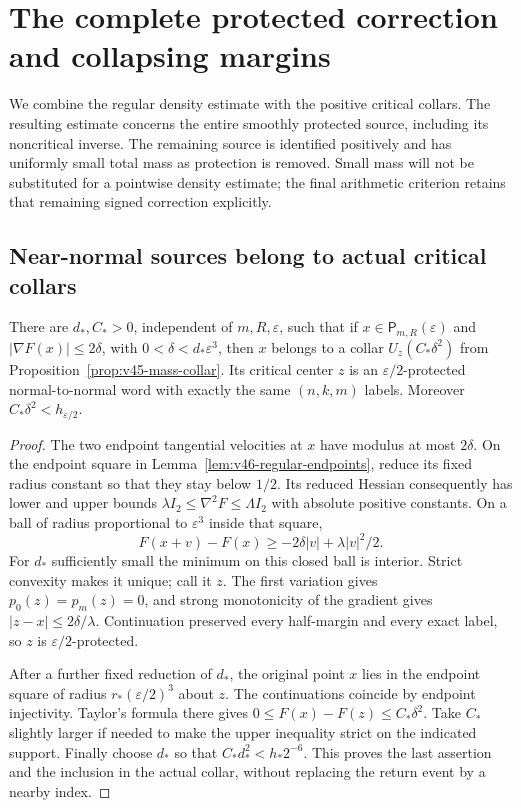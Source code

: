 \section{The complete protected correction and collapsing margins}
\label{sec:v46-protected-reduction}
We combine the regular density estimate with the positive critical
collars. The resulting estimate concerns the entire smoothly protected
source, including its noncritical inverse. The remaining source is
identified positively and has uniformly small total mass as protection
is removed. Small mass will not be substituted for a pointwise density
estimate; the final arithmetic criterion retains that remaining signed
correction explicitly.

\subsection{Near-normal sources belong to actual critical collars}
\begin{lemma}
\label{lem:v46-near-critical-completion}
There are $d_*,C_*>0$, independent of $m,R,\varepsilon$, such that if
$x\in\mathsf P_{m,R}(\varepsilon)$ and
$|\nabla F(x)|\le2\delta$, with $0<\delta<d_*\varepsilon^3$, then
$x$ belongs to a collar $U_z(C_*\delta^2)$ from
Proposition~\ref{prop:v45-mass-collar}. Its critical center $z$ is an
$\varepsilon/2$-protected normal-to-normal word with exactly the same
$(n,k,m)$ labels. Moreover $C_*\delta^2<h_{\varepsilon/2}$.
\end{lemma}
\begin{proof}
The two endpoint tangential velocities at $x$ have modulus at most
$2\delta$. On the endpoint square in
Lemma~\ref{lem:v46-regular-endpoints}, reduce its fixed radius
constant so that they stay below $1/2$. Its reduced Hessian consequently
has lower and upper bounds $\lambda I_2\le\nabla^2F\le\Lambda I_2$
with absolute positive constants. On a ball of radius proportional to
$\varepsilon^3$ inside that square,
\[
 F(x+v)-F(x)\ge-2\delta|v|+\lambda|v|^2/2.
\]
For $d_*$ sufficiently small the minimum on this closed ball is
interior. Strict convexity makes it unique; call it $z$. The first
variation gives $p_0(z)=p_m(z)=0$, and strong monotonicity of the
gradient gives $|z-x|\le2\delta/\lambda$. Continuation preserved every
half-margin and every exact label, so $z$ is
$\varepsilon/2$-protected.

After a further fixed reduction of $d_*$, the original point $x$ lies
in the endpoint square of radius $r_*(\varepsilon/2)^3$ about $z$.
The continuations coincide by endpoint injectivity. Taylor's formula
there gives $0\le F(x)-F(z)\le C_*\delta^2$. Take $C_*$ slightly
larger if needed to make the upper inequality strict on the indicated
support. Finally choose $d_*$ so that
$C_*d_*^2<h_*2^{-6}$. This proves the last assertion and the inclusion
in the actual collar, without replacing the return event by a nearby
index.
\end{proof}

